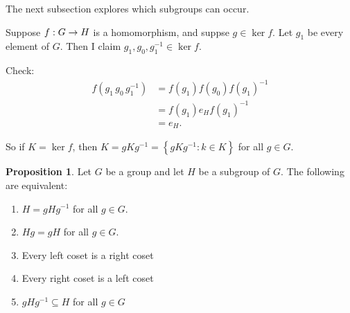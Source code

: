 \documentclass{article}
\theoremstyle{definition} \newtheorem*{definition}{Definition}
\newtheorem{proposition}[theorem]{Proposition}
\begin{document}
The next subsection explores which subgroups can occur.

Suppose $f : G \rightarrow H$ is a homomorphism, and suppse $g \in \ker f$. Let
$g_1$ be every element of $G$. Then I claim $g_1,g_0,g_1^{-1}\in \ker f$.

Check: \begin{align*} f(g_1\,g_0\,g_1^{-1}) &= f(g_1)f(g_0)f(g_1)^{-1}\\ &=
  f(g_1)e_Hf(g_1)^{-1} \\ &= e_H.  \end{align*}

So if $K=\ker f$, then $K=gKg^{-1}=\left\{ gKg^{-1} : k \in K \right\}$ for all
$g \in G.$\\

\begin{proposition} \label{prp:tfae} Let $G$ be a group and let $H$ be a
subgroup of $G$. The following are equivalent: \begin{enumerate} \item
    $H=gHg^{-1}$ for all $g \in G$.  \item $Hg=gH$ for all $g \in G$.  \item
      Every left coset is a right coset \item Every right coset is a left coset
      \item $gHg^{-1} \subseteq H$ for all $g \in G$ \end{enumerate}
  \end{proposition}
\end{document}

